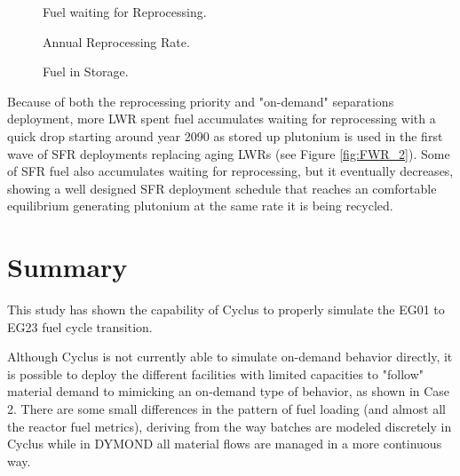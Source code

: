 \documentclass[12pt]{article}
\begin{document}
\begin{figure}[h!]
    \centering
    \caption{Fuel waiting for Reprocessing.\label{fig:ARR_FWR_SFC} }
\end{figure}
\begin{figure}[h!]
    \centering
    \caption{Annual Reprocessing Rate.\label{fig:ARR_FWR_SFC_2} }
\end{figure}
\begin{figure}[h!]
    \centering
    \caption{Fuel in Storage.\label{fig:ARR_FWR_SFC_2} }
\end{figure}

Because of both the reprocessing priority and "on-demand" separations
deployment, more LWR spent fuel accumulates waiting for reprocessing with a
quick drop starting around year 2090 as stored up plutonium is used in the first
wave of SFR deployments replacing aging LWRs (see Figure \ref{fig:FWR_2}). Some
of SFR fuel also accumulates waiting for reprocessing, but it eventually
decreases, showing a well designed SFR deployment schedule that reaches an
comfortable equilibrium generating plutonium at the same rate it is being
recycled.

\section{Summary}

This study has shown the capability of Cyclus to properly simulate the EG01 to
EG23 fuel cycle transition.   

Although Cyclus is not currently able to simulate on-demand behavior directly,
it is possible to deploy the different facilities with limited capacities to
"follow" material demand to mimicking an on-demand type of behavior, as shown in
Case 2. There are some small differences in the pattern of fuel
loading (and almost all the reactor fuel metrics), deriving from the way
batches are modeled discretely in Cyclus while in DYMOND all 
material flows are managed in a more continuous way.
\end{document}
